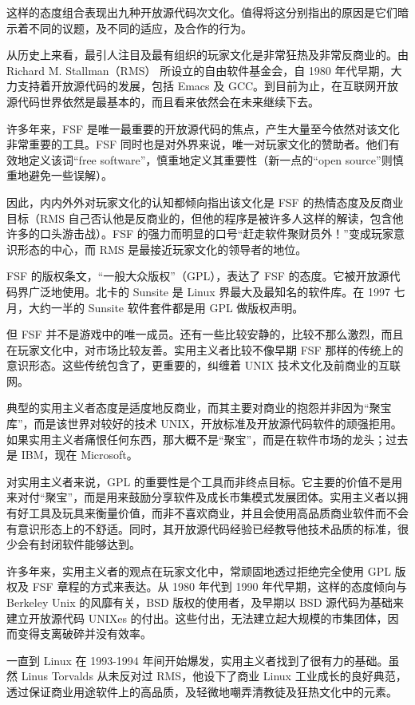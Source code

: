 这样的态度组合表现出九种开放源代码次文化。值得将这分别指出的原因是它们暗示着不同的议题，及不同的适应，及合作的行为。

从历史上来看，最引人注目及最有组织的玩家文化是非常狂热及非常反商业的。由 Richard M. Stallman（RMS） 所设立的自由软件基金会，自 1980 年代早期，大力支持着开放源代码的发展，包括 Emacs 及 GCC。到目前为止，在互联网开放源代码世界依然是最基本的，而且看来依然会在未来继续下去。

许多年来，FSF 是唯一最重要的开放源代码的焦点，产生大量至今依然对该文化非常重要的工具。FSF 同时也是对外界来说，唯一对玩家文化的赞助者。他们有效地定义该词“free software”，慎重地定义其重要性（新一点的“open source”则慎重地避免一些误解）。

因此，内内外外对玩家文化的认知都倾向指出该文化是 FSF 的热情态度及反商业目标（RMS 自己否认他是反商业的，但他的程序是被许多人这样的解读，包含他许多的口头游击战）。FSF 的强力而明显的口号“赶走软件聚财员外！”变成玩家意识形态的中心，而 RMS 是最接近玩家文化的领导者的地位。

FSF 的版权条文，“一般大众版权”（GPL），表达了 FSF 的态度。它被开放源代码界广泛地使用。北卡的 Sunsite 是 Linux 界最大及最知名的软件库。在 1997 七月，大约一半的 Sunsite 软件套件都是用 GPL 做版权声明。

但 FSF 并不是游戏中的唯一成员。还有一些比较安静的，比较不那么激烈，而且在玩家文化中，对市场比较友善。实用主义者比较不像早期 FSF 那样的传统上的意识形态。这些传统包含了，更重要的，纠缠着 UNIX 技术文化及前商业的互联网。

典型的实用主义者态度是适度地反商业，而其主要对商业的抱怨并非因为“聚宝库”，而是该世界对较好的技术 UNIX，开放标准及开放源代码软件的顽强拒用。如果实用主义者痛恨任何东西，那大概不是“聚宝”，而是在软件市场的龙头；过去是 IBM，现在 Microsoft。

对实用主义者来说，GPL 的重要性是个工具而非终点目标。它主要的价值不是用来对付“聚宝”，而是用来鼓励分享软件及成长市集模式发展团体。实用主义者以拥有好工具及玩具来衡量价值，而非不喜欢商业，并且会使用高品质商业软件而不会有意识形态上的不舒适。同时，其开放源代码经验已经教导他技术品质的标准，很少会有封闭软件能够达到。

许多年来，实用主义者的观点在玩家文化中，常顽固地透过拒绝完全使用 GPL 版权及 FSF 章程的方式来表达。从 1980 年代到 1990 年代早期，这样的态度倾向与 Berkeley Unix 的风靡有关，BSD 版权的使用者，及早期以 BSD 源代码为基础来建立开放源代码 UNIXes 的付出。这些付出，无法建立起大规模的市集团体，因而变得支离破碎并没有效率。

一直到 Linux 在 1993-1994 年间开始爆发，实用主义者找到了很有力的基础。虽然 Linus Torvalds 从未反对过 RMS，他设下了商业 Linux 工业成长的良好典范，透过保证商业用途软件上的高品质，及轻微地嘲弄清教徒及狂热文化中的元素。

